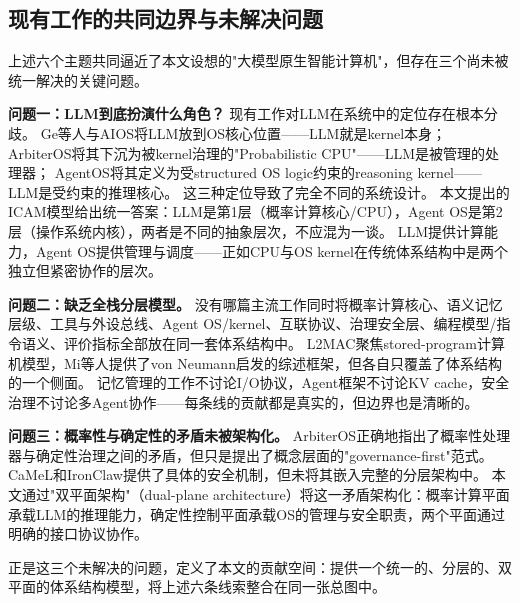 \subsection{现有工作的共同边界与未解决问题}
\label{sec:related-gap}

上述六个主题共同逼近了本文设想的"大模型原生智能计算机"，但存在三个尚未被统一解决的关键问题。

\textbf{问题一：LLM到底扮演什么角色？}
现有工作对LLM在系统中的定位存在根本分歧。
Ge等人与AIOS将LLM放到OS核心位置\cite{ge2023llmos,mei2024aios}——LLM就是kernel本身；
ArbiterOS将其下沉为被kernel治理的"Probabilistic CPU"\cite{arbiteros2025}——LLM是被管理的处理器；
AgentOS将其定义为受structured OS logic约束的reasoning kernel\cite{agentos2025}——LLM是受约束的推理核心。
这三种定位导致了完全不同的系统设计。
本文提出的ICAM模型给出统一答案：LLM是第1层（概率计算核心/CPU），Agent OS是第2层（操作系统内核），两者是不同的抽象层次，不应混为一谈。
LLM提供计算能力，Agent OS提供管理与调度——正如CPU与OS kernel在传统体系结构中是两个独立但紧密协作的层次。

\textbf{问题二：缺乏全栈分层模型。}
没有哪篇主流工作同时将概率计算核心、语义记忆层级、工具与外设总线、Agent OS/kernel、互联协议、治理安全层、编程模型/指令语义、评价指标全部放在同一套体系结构中。
L2MAC\cite{holt2024l2mac}聚焦stored-program计算机模型，Mi等人\cite{mi2025llmagentscomputersystems}提供了von Neumann启发的综述框架，但各自只覆盖了体系结构的一个侧面。
记忆管理的工作不讨论I/O协议，Agent框架不讨论KV cache，安全治理不讨论多Agent协作——每条线的贡献都是真实的，但边界也是清晰的。

\textbf{问题三：概率性与确定性的矛盾未被架构化。}
ArbiterOS\cite{arbiteros2025}正确地指出了概率性处理器与确定性治理之间的矛盾，但只是提出了概念层面的"governance-first"范式。
CaMeL\cite{debenedetti2025camel}和IronClaw\cite{ironclaw2025}提供了具体的安全机制，但未将其嵌入完整的分层架构中。
本文通过"双平面架构"（dual-plane architecture）将这一矛盾架构化：概率计算平面承载LLM的推理能力，确定性控制平面承载OS的管理与安全职责，两个平面通过明确的接口协议协作。

正是这三个未解决的问题，定义了本文的贡献空间：提供一个统一的、分层的、双平面的体系结构模型，将上述六条线索整合在同一张总图中。